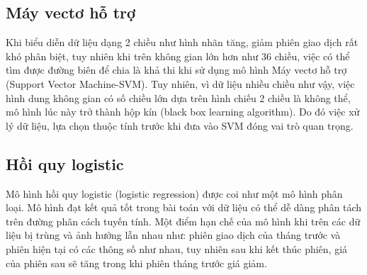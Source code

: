 \subsection{Máy vectơ hỗ trợ}
Khi biểu diễn dữ liệu dạng 2 chiều như hình %
nhãn tăng, giảm phiên giao dịch rất khó phân biệt, tuy nhiên khi trên không gian lớn hơn như 36 chiều, việc có thể tìm được đường biên để chia là khả thi khi sử dụng mô hình Máy vectơ hỗ trợ (Support Vector Machine-SVM).
Tuy nhiên, vì dữ liệu nhiều chiều như vậy, việc hình dung không gian có số chiều lớn dựa trên hình chiếu 2 chiều là không thể, mô hình lúc này trở thành hộp kín (black box learning algorithm). Do đó việc xử lý dữ liệu, lựa chọn thuộc tính trước khi đưa vào SVM đóng vai trò quan trọng.

\subsection{Hồi quy logistic}
Mô hình hồi quy logistic (logistic regression) được coi như một mô hình phân loại. Mô hình đạt kết quả tốt trong bài toán với dữ liệu có thể dễ dàng phân tách trên đường phân cách tuyến tính. Một điểm hạn chế của mô hình khi trên các dữ liệu bị trùng và ảnh hưởng lẫn nhau như: phiên giao dịch của tháng trước và phiên hiện tại có các thông số như nhau, tuy nhiên sau khi kết thúc phiên, giá của phiên sau sẽ tăng trong khi phiên tháng trước giá giảm.
